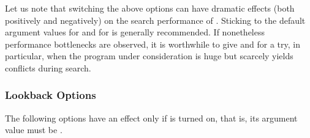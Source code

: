 %
Let us note that switching the above options can have dramatic effects
(both positively and negatively) on the search performance of \clasp.
Sticking to the default argument values  for 
and  for  is generally recommended.
If nonetheless performance bottlenecks are observed,
it is worthwhile to give  and  for 
a try, in particular,
when the program under consideration is huge 
but scarcely yields conflicts during search.


\subsubsection{Lookback Options}\label{subsec:clasp:back}

The following options have an effect only if 
is turned on, that is, its argument value must be .
%
